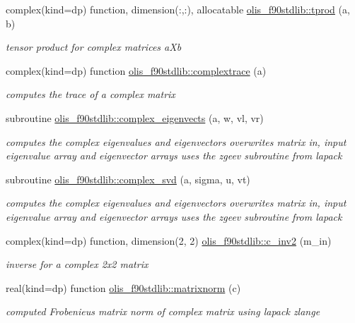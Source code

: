 \begin{DoxyCompactItemize}
complex(kind=dp) function, dimension(\+:,\+:), allocatable \hyperlink{namespaceolis__f90stdlib_af055cdf442d596810974e4f63eaeb119}{olis\+\_\+f90stdlib\+::tprod} (a, b)
\begin{DoxyCompactList}\small\item\em tensor product for complex matrices a\+Xb \end{DoxyCompactList}\item 
complex(kind=dp) function \hyperlink{namespaceolis__f90stdlib_aaa6e9aabcf33a6f7052e1db5aa5dcf70}{olis\+\_\+f90stdlib\+::complextrace} (a)
\begin{DoxyCompactList}\small\item\em computes the trace of a complex matrix \end{DoxyCompactList}\item 
subroutine \hyperlink{namespaceolis__f90stdlib_a71c5b363b52932a5c69053149ac8cc25}{olis\+\_\+f90stdlib\+::complex\+\_\+eigenvects} (a, w, vl, vr)
\begin{DoxyCompactList}\small\item\em computes the complex eigenvalues and eigenvectors  overwrites matrix in, input eigenvalue array and eigenvector arrays uses the zgeev subroutine from lapack \end{DoxyCompactList}\item 
subroutine \hyperlink{namespaceolis__f90stdlib_a81e060e6ecfde9524a9732349a818db3}{olis\+\_\+f90stdlib\+::complex\+\_\+svd} (a, sigma, u, vt)
\begin{DoxyCompactList}\small\item\em computes the complex eigenvalues and eigenvectors  overwrites matrix in, input eigenvalue array and eigenvector arrays uses the zgeev subroutine from lapack \end{DoxyCompactList}\item 
complex(kind=dp) function, dimension(2, 2) \hyperlink{namespaceolis__f90stdlib_a162dd5131a39a62d7b95e2ebca4664a4}{olis\+\_\+f90stdlib\+::c\+\_\+inv2} (m\+\_\+in)
\begin{DoxyCompactList}\small\item\em inverse for a complex 2x2 matrix \end{DoxyCompactList}\item 
real(kind=dp) function \hyperlink{namespaceolis__f90stdlib_a43175b11cfecf961b5e6e597cfb2f848}{olis\+\_\+f90stdlib\+::matrixnorm} (c)
\begin{DoxyCompactList}\small\item\em computed Frobenieus matrix norm of complex matrix using lapack zlange \end{DoxyCompactList}\item 

\end{DoxyCompactItemize}
